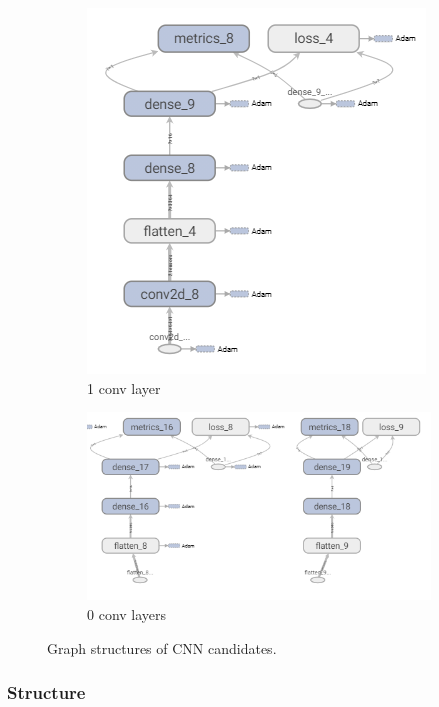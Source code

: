 \begin{figure}[H]
\begin{subfigure}[b]{0.3\linewidth}
		\includegraphics[width=\linewidth]{plots/cnn-candidates-1-conv.png}
		\caption{1 conv layer}
	\end{subfigure}
	\begin{subfigure}[b]{0.3\linewidth}
		\includegraphics[width=\linewidth]{plots/cnn-candidates-0-conv.png}
		\caption{0 conv layers}
	\end{subfigure}
	\caption{Graph structures of \gls{CNN} candidates.}
	\label{fig:cnn-structure-abstract}
\end{figure}

\subsubsection{Structure}\label{ch:cnn-design}

